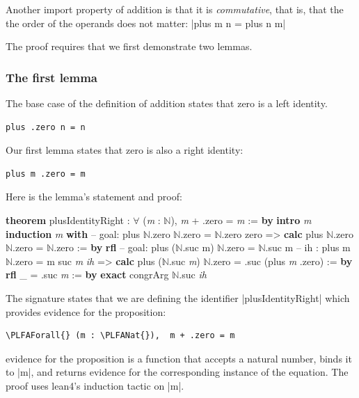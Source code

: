 \documentclass{memoir}
\newcommand{\PLFANat}{\ensuremath{\mathbb{N}}}
\newcommand{\PLFAForall}{\ensuremath{\forall}}
\newcommand{\PLFAComment}[1]{\textcolor{codecomment}{#1}}
\begin{document}
\par
Another import property of addition is that it is \emph{commutative}, that is, that
the the order of the operands does not matter:
\LeanVerb|plus m n = plus n m|

\par
\par\noindent The proof requires that we first demonstrate two lemmas.

\par

\subsubsection{The first lemma}\label{PLFA--in--Lean----Part--1----Induction-005F-005F-005F--Proof--by--Induction----Second--proof-005F-005F-005F--commutativity----The--first--lemma}

\par
The base case of the definition of addition states that zero is a left identity.

\par
\par\noindent \begin{verbatim}
plus .zero n = n
\end{verbatim}
Our first lemma states that zero is also a right identity:\begin{verbatim}
plus m .zero = m
\end{verbatim}
Here is the lemma's statement and proof:\begin{LeanVerbatim}
\textbf{theorem} plusIdentityRight : \PLFAForall{} (\textit{m} : \PLFANat{}),  \textit{m} + .zero = \textit{m} := \textbf{by}
    \textbf{intro} \textit{m}
    \textbf{induction} \textit{m} \textbf{with}
    \PLFAComment{-- goal: plus \PLFANat{}.zero \PLFANat{}.zero = \PLFANat{}.zero}
     zero =>
        \textbf{calc}
            plus \PLFANat{}.zero \PLFANat{}.zero
            = \PLFANat{}.zero            := \textbf{by} \textbf{rfl}
    \PLFAComment{-- goal: plus (\PLFANat{}.suc m) \PLFANat{}.zero = \PLFANat{}.suc m}
    \PLFAComment{--       ih : plus m \PLFANat{}.zero = m}
     suc \textit{m} \textit{ih} =>
        \textbf{calc}
            plus (\PLFANat{}.suc \textit{m}) \PLFANat{}.zero
            = .suc (plus \textit{m} .zero) := \textbf{by} \textbf{rfl}
          _ = .suc \textit{m}              := \textbf{by} \textbf{exact} congrArg \PLFANat{}.suc \textit{ih}
\end{LeanVerbatim}
The signature states that we are defining the identifier \LeanVerb|plusIdentityRight|
which provides evidence for the proposition:\begin{verbatim}
\PLFAForall{} (m : \PLFANat{}),  m + .zero = m
\end{verbatim}
evidence for the proposition is a function that accepts a natural number, binds
it to \LeanVerb|m|, and returns evidence for the corresponding instance of the equation.
The proof uses lean4's induction tactic on \LeanVerb|m|.
\end{document}
